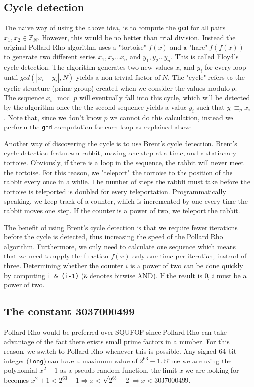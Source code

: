 \documentclass{article}
\begin{document}
\subsection{Cycle detection}
The naive way of using the above idea, is to compute the \verb!gcd! for all pairs $x_1, x_2 \in \mathbb{Z}_N$. However, this would be no better than trial division. Instead the original Pollard Rho algorithm uses a "tortoise" $f(x)$ and a "hare" $f(f(x))$ to generate two different series $x_1, x_2\ldots x_n$ and $y_1, y_2\ldots y_n$. This is called Floyd's cycle detection. The algorithm generates two new values $x_i$ and $y_i$ for every loop until $gcd(|x_i-y_i|, N)$ yields a non trivial factor of $N$. The "cycle" refers to the cyclic structure (prime group) created when we consider the values modulo $p$. The sequence $x_i \mod p$ will eventually fall into this cycle, which will be detected by the algorithm once the the second sequence yields a value $y_i$ such that $y_i\equiv_p x_i$. Note that, since we don't know $p$ we cannot do this calculation, instead we perform the \verb!gcd! computation for each loop as explained above. 

Another way of discovering the cycle is to use Brent's cycle detection. Brent's cycle detection features a rabbit, moving one step at a time, and a stationary tortoise. Obviously, if there is a loop in the sequence, the rabbit will never meet the tortoise. For this reason, we "teleport" the tortoise to the position of the rabbit every once in a while. The number of steps the rabbit must take before the tortoise is teleported is doubled for every teleportation. Programmatically speaking, we keep track of a counter, which is incremented by one every time the rabbit moves one step. If the counter is a power of two, we teleport the rabbit. 

The benefit of using Brent's cycle detection is that we require fewer iterations before the cycle is detected, thus increasing the speed of the Pollard Rho algorithm. Furthermore, we only need to calculate one sequence which means that we need to apply the function $f(x)$ only one time per iteration, instead of three. Determining whether the counter $i$ is a power of two can be done quickly by computing \verb!i & (i-1)! (\verb!&! denotes bitwise AND). If the result is 0, $i$ must be a power of two\cite{barnes}.

\subsection{The constant 3037000499}
Pollard Rho would be preferred over SQUFOF since Pollard Rho can take advantage of the fact there exists small prime factors in a number. For this reason, we switch to Pollard Rho whenever this is possible. Any signed 64-bit integer (\verb!long!) can have a maximum value of $2^{63}-1$. Since we are using the polynomial $x^2+1$ as a pseudo-random function, the limit $x$ we are looking for becomes $x^2+1<2^{63}-1 \Rightarrow x < \sqrt{2^{63}-2} \Rightarrow x < 3037000499$.
\end{document}
